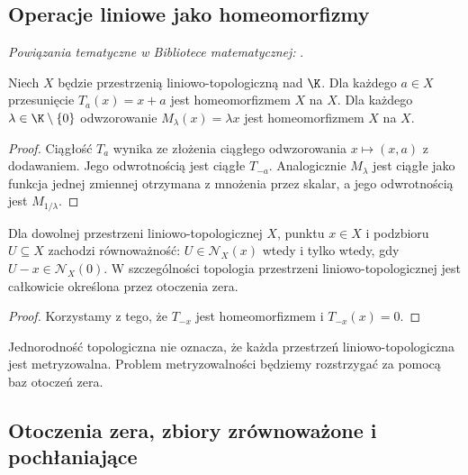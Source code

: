 \subsection{Operacje liniowe jako homeomorfizmy}

\noindent\emph{Powiązania tematyczne w Bibliotece matematycznej:} .


\begin{stwierdzenie}\label{prop:translation}
Niech $X$ będzie przestrzenią liniowo-topologiczną nad $\K$.
Dla każdego $a\in X$ przesunięcie $T_a(x)=x+a$ jest
homeomorfizmem $X$ na $X$. Dla każdego $\lambda\in\K\setminus\{0\}$
odwzorowanie $M_\lambda(x)=\lambda x$ jest homeomorfizmem $X$ na $X$.
\end{stwierdzenie}
\begin{proof}
Ciągłość $T_a$ wynika ze złożenia ciągłego odwzorowania
$x\mapsto(x,a)$ z dodawaniem. Jego odwrotnością jest ciągłe $T_{-a}$.
Analogicznie $M_\lambda$ jest ciągłe jako funkcja jednej zmiennej
otrzymana z mnożenia przez skalar, a jego odwrotnością jest
$M_{1/\lambda}$.
\end{proof}

\begin{wniosek}\label{cor:zero-neighborhood}
Dla dowolnej przestrzeni liniowo-topologicznej $X$, punktu $x\in X$
i podzbioru $U\subseteq X$ zachodzi równoważność:
$U\in\mathcal N_X(x)$ wtedy i tylko wtedy, gdy
$U-x\in\mathcal N_X(0)$. W szczególności topologia przestrzeni
liniowo-topologicznej jest całkowicie określona przez otoczenia zera.
\end{wniosek}
\begin{proof}
Korzystamy z tego, że $T_{-x}$ jest homeomorfizmem i
$T_{-x}(x)=0$.
\end{proof}

\begin{uwaga}
Jednorodność topologiczna nie oznacza, że każda przestrzeń
liniowo-topologiczna jest metryzowalna. Problem metryzowalności
będziemy rozstrzygać za pomocą baz otoczeń zera.
\end{uwaga}

\subsection{Otoczenia zera, zbiory zrównoważone i pochłaniające}

